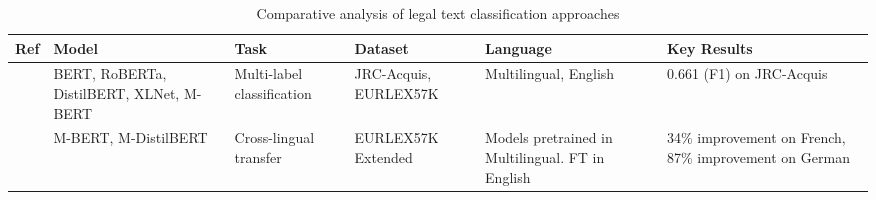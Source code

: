 \documentclass[runningheads]{llncs}
\begin{document}


\begin{table}[ht]
\centering
\caption{Comparative analysis of legal text classification approaches}
\scriptsize
\label{tab:work-summary}
\begin{tabularx}{\textwidth}{p{}XXXXp{}}
\hline
\textbf{Ref} & \textbf{Model} & \textbf{Task} & \textbf{Dataset} & \textbf{Language} & \textbf{Key Results} \\ 
\hline
\cite{Shaheen2020} & BERT, RoBERTa, DistilBERT, XLNet, M-BERT &
                                                                Multi-label
                                                                classification
                                                                     &
                                                                       JRC-Acquis, EURLEX57K & Multilingual, English  & 0.661 (F1) on JRC-Acquis \\

\cite{Shaheen2021} & M-BERT, M-DistilBERT & Cross-lingual transfer &
                                                                     EURLEX57K
                                                                     Extended
                                                                                        &
                                                                                          Models
                                                                                          pretrained
                                                                                          in
                                                                                          Multilingual. FT
                                                                                          in
                                                                                          English & 34\% improvement on French, 87\% improvement on German \\


\end{tabularx}
\end{table}
\end{document}
